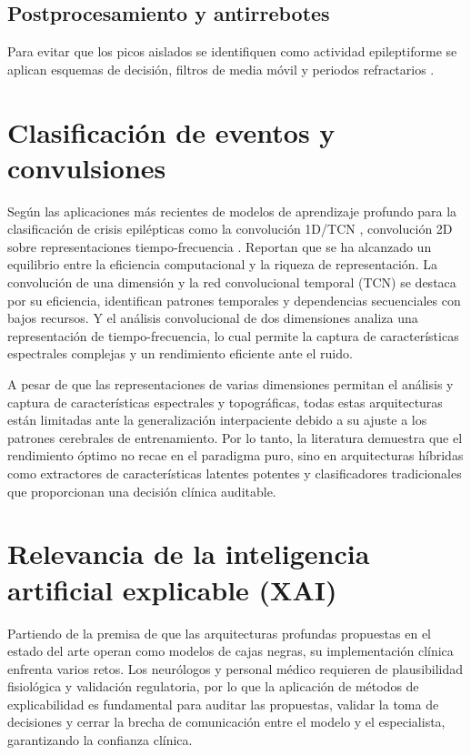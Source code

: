 \subsection{Postprocesamiento y antirrebotes}
Para evitar que los picos aislados se identifiquen como actividad epileptiforme se aplican esquemas de decisión, filtros de media móvil y periodos refractarios \cite{wu_review_2025, wang2025eeg}.

\section{Clasificación de eventos y convulsiones}
Según las aplicaciones más recientes de modelos de aprendizaje profundo para la clasificación de crisis epilépticas como la convolución 1D/TCN \cite{wang2025eeg}, convolución 2D sobre representaciones tiempo-frecuencia \cite{sahatchindaDiagnosisEpilepticSeizures2025}. Reportan que se ha alcanzado un equilibrio entre la eficiencia computacional y la riqueza de representación. La convolución de una dimensión y la red convolucional temporal (TCN) se destaca por su eficiencia, identifican patrones temporales y dependencias secuenciales con bajos recursos. Y el análisis convolucional de dos dimensiones analiza una representación de tiempo-frecuencia, lo cual permite la captura de características espectrales complejas y un rendimiento eficiente ante el ruido.  

A pesar de que las representaciones de varias dimensiones permitan el análisis y captura de características espectrales y topográficas, todas estas arquitecturas están limitadas ante la generalización interpaciente debido a su ajuste a los patrones cerebrales de entrenamiento. Por lo tanto, la literatura demuestra que el rendimiento óptimo no recae en el paradigma puro, sino en arquitecturas híbridas como extractores de características latentes potentes y clasificadores tradicionales que proporcionan una decisión clínica auditable.

\section{Relevancia de la inteligencia artificial explicable (XAI)}
Partiendo de la premisa de que las arquitecturas profundas propuestas en el estado del arte operan como modelos de cajas negras, su implementación clínica enfrenta varios retos. Los neurólogos y personal médico requieren de plausibilidad fisiológica \cite{ahmadAdvancedMultimodalLearning2026} y validación regulatoria, por lo que la aplicación de métodos de explicabilidad es fundamental para auditar las propuestas, validar la toma de decisiones y cerrar la brecha de comunicación entre el modelo y el especialista, garantizando la confianza clínica.

